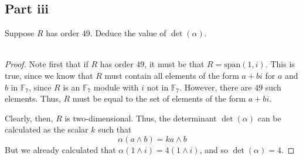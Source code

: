 \documentclass[12pt,reqno]{amsart}
\begin{document}
\subsection*{Part iii}
Suppose $R$ has order $49$. Deduce the value of $\det(\alpha)$.
\\
\\
\begin{proof}
    Note first that if $R$ has order $49$, it must be that $R =
    \text{span}(1,i)$. This is true, since we know that $R$ must contain all
    elements of the form $a+bi$ for $a$ and $b$ in $\mathbb{F}_7$, since $R$ is
    an $\mathbb{F}_7$ module with $i$ not in $\mathbb{F}_7$. However, there are
    $49$ such elements. Thus, $R$ must be equal to the set of elements of the
    form $a+bi$.

    Clearly, then, $R$ is two-dimensional. Thus, the determinant $\det(\alpha)$
    can be calculated as the scalar $k$ such that
    \[
        \alpha(a\wedge b) = k a\wedge b
    \]
    But we already calculated that $\alpha(1\wedge i) = 4(1\wedge i)$, and so
    $\det(\alpha) = 4$.
\end{proof}
\end{document}
